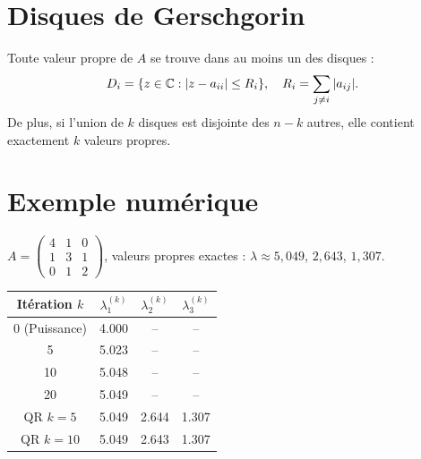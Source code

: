 \section{Disques de Gerschgorin}

\begin{theoreme}[Gerschgorin]\label{thm:gerschgorin}
Toute valeur propre de $A$ se trouve dans au moins un des disques :
\[
D_i = \{z\in\mathbb{C} : |z-a_{ii}|\leq R_i\}, \quad R_i=\sum_{j\neq i}|a_{ij}|.
\]
De plus, si l'union de $k$ disques est disjointe des $n-k$ autres, elle contient exactement $k$ valeurs propres.
\end{theoreme}

\begin{center}
\end{center}

\section{Exemple num\'erique}

$A=\begin{pmatrix}4&1&0\\1&3&1\\0&1&2\end{pmatrix}$, valeurs propres exactes : $\lambda\approx 5{,}049$, $2{,}643$, $1{,}307$.

\begin{center}
\begin{tabular}{cccc}
\toprule
It\'eration $k$ & $\lambda_1^{(k)}$ & $\lambda_2^{(k)}$ & $\lambda_3^{(k)}$ \\
\midrule
0 (Puissance) & 4.000 & -- & -- \\
5 & 5.023 & -- & -- \\
10 & 5.048 & -- & -- \\
20 & 5.049 & -- & -- \\
\midrule
QR $k=5$ & 5.049 & 2.644 & 1.307 \\
QR $k=10$ & 5.049 & 2.643 & 1.307 \\
\bottomrule
\end{tabular}
\end{center}


